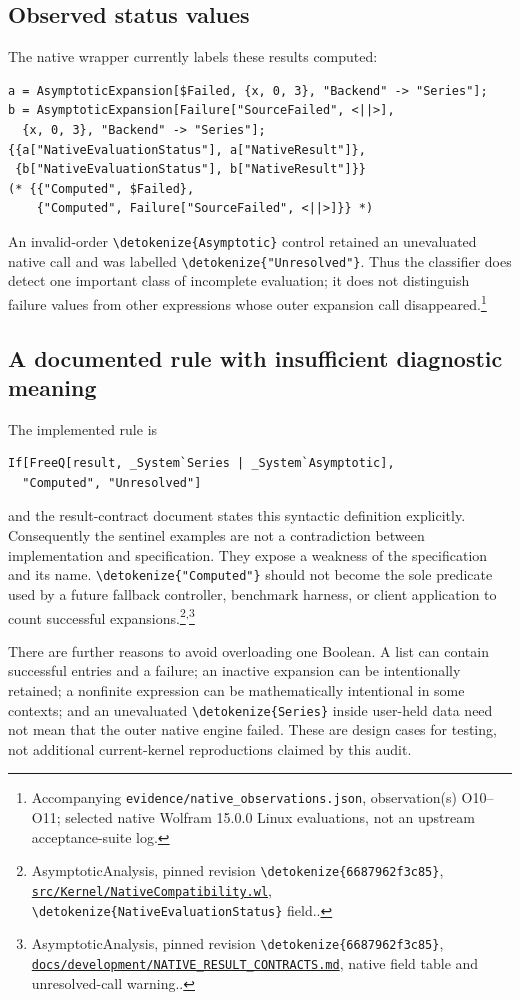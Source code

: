 \documentclass[11pt]{article}
\newcommand{\code}[1]{{\ttfamily\expandafter\nolinkurl\expandafter{\detokenize{#1}}}}
\newcommand{\repo}{https://github.com/VladimirReshetnikov/Asymptotic/blob/6687962f3c858a4f93623cfc496f33e35c6763d4/}
\newcommand{\src}[2]{\footnote{AsymptoticAnalysis, pinned revision \code{6687962f3c85}, \href{\repo#1}{\nolinkurl{#1}}, #2.}}
\newcommand{\obs}[1]{\footnote{Accompanying \nolinkurl{evidence/native_observations.json}, observation(s) #1; selected native Wolfram 15.0.0 Linux evaluations, not an upstream acceptance-suite log.}}
\begin{document}
\subsection{Observed status values}
The native wrapper currently labels these results computed:
\begin{lstlisting}
a = AsymptoticExpansion[$Failed, {x, 0, 3}, "Backend" -> "Series"];
b = AsymptoticExpansion[Failure["SourceFailed", <||>],
  {x, 0, 3}, "Backend" -> "Series"];
{{a["NativeEvaluationStatus"], a["NativeResult"]},
 {b["NativeEvaluationStatus"], b["NativeResult"]}}
(* {{"Computed", $Failed},
    {"Computed", Failure["SourceFailed", <||>]}} *)
\end{lstlisting}
An invalid-order \code{Asymptotic} control retained an unevaluated native call and was labelled \code{"Unresolved"}. Thus the classifier does detect one important class of incomplete evaluation; it does not distinguish failure values from other expressions whose outer expansion call disappeared.\obs{O10--O11}

\subsection{A documented rule with insufficient diagnostic meaning}
The implemented rule is
\begin{lstlisting}
If[FreeQ[result, _System`Series | _System`Asymptotic],
  "Computed", "Unresolved"]
\end{lstlisting}
and the result-contract document states this syntactic definition explicitly. Consequently the sentinel examples are not a contradiction between implementation and specification. They expose a weakness of the specification and its name. \code{"Computed"} should not become the sole predicate used by a future fallback controller, benchmark harness, or client application to count successful expansions.\src{src/Kernel/NativeCompatibility.wl}{\code{NativeEvaluationStatus} field.}\textsuperscript{,}\src{docs/development/NATIVE_RESULT_CONTRACTS.md}{native field table and unresolved-call warning.}

There are further reasons to avoid overloading one Boolean. A list can contain successful entries and a failure; an inactive expansion can be intentionally retained; a nonfinite expression can be mathematically intentional in some contexts; and an unevaluated \code{Series} inside user-held data need not mean that the outer native engine failed. These are design cases for testing, not additional current-kernel reproductions claimed by this audit.
\end{document}
